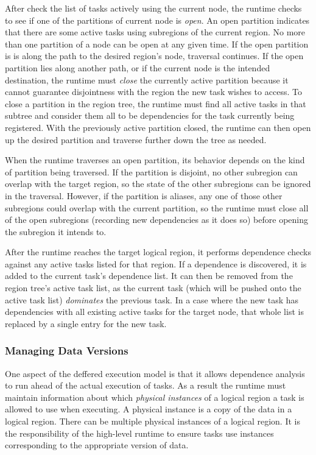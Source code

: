 After check the list of tasks actively using the current node, the runtime
checks to see if one of the partitions of current node is {\em open}.  An
open partition indicates that there are some active tasks using subregions
of the current region.  No more than one partition of a node can be open
at any given time.  If the open partition is is along the path to the desired
region's node, traversal continues.  If the open partition lies along another 
path, or if the current node is the intended destination, the runtime must
{\em close} the currently active partition because it cannot guarantee
disjointness with the region the new task wishes to access.  To close a
partition in the region tree, the runtime must find all active tasks in that
subtree and consider them all to be dependencies for the task currently being
registered.  With the previously active partition closed, the runtime can 
then open up the desired partition and traverse further down the tree as
needed.

When the runtime traverses an open partition, its behavior depends on the kind
of partition being traversed.  If the partition is disjoint, no other subregion
can overlap with the target region, so the state of the other subregions can
be ignored in the traversal.  However, if the partition is aliases, any one
of those other subregions could overlap with the current partition, so
the runtime must close all of the open subregions (recording new dependencies
as it does so) before opening the subregion it intends to.

After the runtime reaches the target logical region, it performs dependence
checks against any active tasks listed for that region.  If a dependence is 
discovered, it is added to the current task's dependence list.  It can then
be removed from the region tree's active task list, as the current task (which
will be pushed onto the active task list) {\em dominates} the previous task.
In a case where the new task has dependencies with all existing active tasks
for the target node, that whole list is replaced by a single entry for the
new task.

\subsubsection{Managing Data Versions}
\label{subsec:dataflow}
One aspect of the deffered execution model is that it allows dependence analysis to run
ahead of the actual execution of tasks.  As a result the runtime must maintain information
about which {\em physical instances} of a logical region a task is allowed to use when executing.
A physical instance is a copy of the data in a logical region.  There can be multiple
physical instances of a logical region.  It is the responsibility of the high-level runtime
to ensure tasks use instances corresponding to the appropriate version of data.


